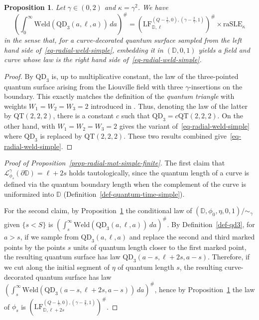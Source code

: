 \documentclass[a4paper]{article}
\numberwithin{equation}{section}
\newcommand{\eqb}{\begin{equation}}
\newcommand{\eqe}{\end{equation}}
\newcommand{\bbD}{\mathbb{D}}
\newcommand{\D}{\mathbb{D}}
\newcommand{\cL}{\mathcal{L}}
\newcommand{\QD}{\mathrm{QD}}
\newcommand{\QT}{\mathrm{QT}}
\newcommand{\LF}{\mathrm{LF}}
\newtheorem{proposition}[theorem]{Proposition}
\theoremstyle{remark}
\numberwithin{equation}{section}
\begin{document}
\begin{proposition}\label{prop-radial-weld-simple}
Let $\gamma \in (0,2)$ and $\kappa = \gamma^2$. We have 
\eqb\label{eq-radial-weld-simple}
\left(\int_0^\infty \mathrm{Weld}(\QD_{3}(a, \ell, a)) \, da \right)^\# = (\LF_{\mathbb D, \ell}^{(Q-\frac1\gamma, 0), (\gamma - \frac2\gamma, 1)})^\# \times \mathrm{raSLE}_\kappa
\eqe
    in the sense that, for a  curve-decorated quantum surface sampled from the left hand side of~\eqref{eq-radial-weld-simple}, embedding it in $(\bbD, 0, 1)$ yields a field and curve whose law is the right hand side of~\eqref{eq-radial-weld-simple}.  
\end{proposition}
\begin{proof}
    By \cite[Proposition 2.18, Remark 2.19]{ahs-integrability} $\QD_3$ is, up to multiplicative constant, the law of the three-pointed quantum surface arising from the Liouville field with three $\gamma$-insertions on the boundary. This exactly matches the definition of the \emph{quantum triangle} with weights $W_1 = W_2 = W_3 = 2$ introduced in \cite[Definition 2.17]{ASY22}. Thus, denoting the law of the latter by $\QT(2,2,2)$, there is  a constant $c$ such that $\QD_3 = c \QT(2,2,2)$. 
    On the other hand, \cite[Theorem 1.1]{ay-radial} with $W_1 = W_2 = W_3 = 2$ gives the variant of~\eqref{eq-radial-weld-simple} where $\QD_3$ is replaced by $\QT(2,2,2)$. These two results combined give~\eqref{eq-radial-weld-simple}.
\end{proof}


\begin{proof}[{Proof of Proposition~\ref{prop-radial-mot-simple-finite}}]
The first claim that $\cL_{\phi_s}^\gamma(\partial \D) = \ell + 2s$ holds tautologically, since the quantum length of a curve is defined via the quantum boundary length when the complement of the curve is uniformized into $\D$ (Definition~\ref{def-quantum-time-simple}). 

    For the second claim, by Proposition~\ref{prop-radial-weld-simple} the conditional law of $(\bbD, \phi_0, \eta, 0, 1)/{\sim_\gamma}$ given $\{ s < S\}$ is $(\int_s^\infty \mathrm{Weld}( {\QD}_3(a, \ell, a)) \, da )^\#$. By Definition~\ref{def-qd3}, for $a > s$, if we sample from $ \QD_3(a,\ell, a)$ and replace the second and third marked points by the points $s$ units of quantum length closer to the first marked point, the resulting quantum surface has law $ \QD_3(a-s, \ell+2s, a-s)$.
    Therefore, if we cut along the initial segment of $\eta$ of quantum length $s$, the resulting curve-decorated quantum surface has law $(\int_s^\infty \mathrm{Weld}( \QD_3(a - s, \ell+2s, a - s)) \, da )^\#$, hence by Proposition~\ref{prop-radial-weld-simple} the law of $\phi_s$ is $(\LF_{\mathbb D, \ell+2s}^{(Q-\frac1\gamma, 0), (\gamma - \frac2\gamma, 1)})^\#$.
\end{proof}
\end{document}
